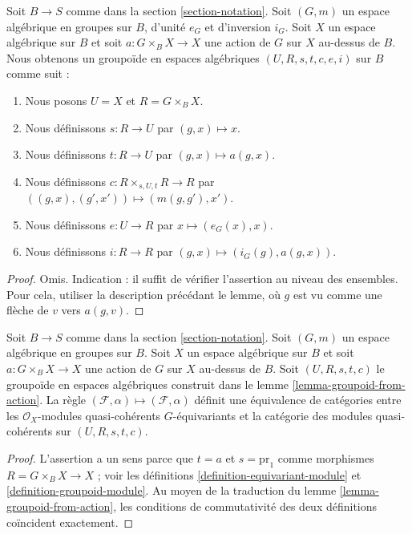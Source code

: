 \begin{lemma}
\label{lemma-groupoid-from-action}
Soit $B \to S$ comme dans la section \ref{section-notation}. Soit $(G, m)$ un espace algébrique en groupes sur $B$, d'unité $e_G$ et d'inversion $i_G$. Soit $X$ un espace algébrique sur $B$ et soit $a : G \times_B X \to X$ une action de $G$ sur $X$ au-dessus de $B$. Nous obtenons un groupoïde en espaces algébriques $(U, R, s, t, c, e, i)$ sur $B$ comme suit :
\begin{enumerate}
\item Nous posons $U = X$ et $R = G \times_B X$.
\item Nous définissons $s : R \to U$ par $(g, x) \mapsto x$.
\item Nous définissons $t : R \to U$ par $(g, x) \mapsto a(g, x)$.
\item Nous définissons $c : R \times_{s, U, t} R \to R$ par $((g, x), (g', x')) \mapsto (m(g, g'), x')$.
\item Nous définissons $e : U \to R$ par $x \mapsto (e_G(x), x)$.
\item Nous définissons $i : R \to R$ par $(g, x) \mapsto (i_G(g), a(g, x))$.
\end{enumerate}
\end{lemma}

\begin{proof}
Omis. Indication : il suffit de vérifier l'assertion au niveau des ensembles. Pour cela, utiliser la description précédant le lemme, où $g$ est vu comme une flèche de $v$ vers $a(g, v)$.
\end{proof}

\begin{lemma}
\label{lemma-action-groupoid-modules}
Soit $B \to S$ comme dans la section \ref{section-notation}. Soit $(G, m)$ un espace algébrique en groupes sur $B$. Soit $X$ un espace algébrique sur $B$ et soit $a : G \times_B X \to X$ une action de $G$ sur $X$ au-dessus de $B$. Soit $(U, R, s, t, c)$ le groupoïde en espaces algébriques construit dans le lemme \ref{lemma-groupoid-from-action}. La règle $(\mathcal{F}, \alpha) \mapsto (\mathcal{F}, \alpha)$ définit une équivalence de catégories entre les $\mathcal{O}_X$-modules quasi-cohérents $G$-équivariants et la catégorie des modules quasi-cohérents sur $(U, R, s, t, c)$.
\end{lemma}

\begin{proof}
L'assertion a un sens parce que $t = a$ et $s = \text{pr}_1$ comme morphismes $R = G \times_B X \to X$ ; voir les définitions \ref{definition-equivariant-module} et \ref{definition-groupoid-module}. Au moyen de la traduction du lemme \ref{lemma-groupoid-from-action}, les conditions de commutativité des deux définitions coïncident exactement.
\end{proof}





